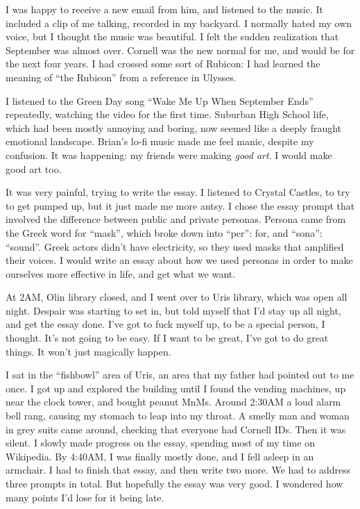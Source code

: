 I was happy to receive a new email from him, and listened to the music.  It
included a clip of me talking, recorded in my backyard.  I normally hated my own
voice, but I thought the music was beautiful.  I felt the sudden realization that
September was almost over.   Cornell was the new normal for me,
and would be for the next four years.  I had crossed some sort of Rubicon: I had
learned the meaning of ``the Rubicon'' from a reference in Ulysses. 

I listened to the Green Day song ``Wake Me Up When September Ends'' repeatedly,
watching the video for the first time.  Suburban High School life, which had
been mostly annoying and boring, now seemed like a deeply fraught emotional
landscape.  Brian's lo-fi music made me feel manic, despite my confusion. It was
happening: my friends were making \textit{good art}.  I would make good art too.

It was very painful, trying to write the essay.  I listened to Crystal Castles,
to try to get pumped up, but it just made me more antsy.   I chose the essay
prompt that involved the difference between public and private personas.
Persona came from the Greek word for ``mask'', which broke down into ``per'':
for, and ``sona'': ``sound''.  Greek actors didn't have electricity, so they
used masks that amplified their voices.  I would write an essay about how we
used personas in order to make ourselves more effective in life, and get what we
want.

At 2AM, Olin library closed, and I went over to Uris library, which was open all
night.  Despair was starting to set in, but told myself that I'd stay up all
night, and get the essay done.  I've got to fuck myself up, to be a special
person, I thought.  It's not going to be easy.  If I want to be great, I've got
to do great things.  It won't just magically happen.  

I sat in the ``fishbowl'' area of Uris, an area that my father had pointed out
to me once.  I got up and explored the building until I found the vending
machines, up near the clock tower, and bought peanut MnMs.  Around 2:30AM a loud
alarm bell rang, causing my stomach to leap into my throat.  A smelly man and
woman in grey suits came around, checking that everyone had Cornell IDs.  Then
it was silent.  I slowly made progress on the essay, spending most of my time on
Wikipedia.  By 4:40AM, I was finally mostly done, and I fell asleep in an
armchair.  I had to finish that essay, and then write two more.  We had to
address three prompts in total.  But hopefully the essay was very good.  I
wondered how many points I'd lose for it being late.

